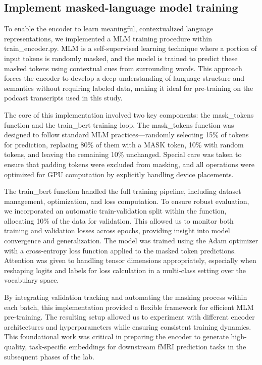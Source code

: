 \documentclass[11pt,letterpaper]{article}
\begin{document}
\vspace{1em} %
\subsection{Implement masked-language model training}
\vspace{0.5em} %

To enable the encoder to learn meaningful, contextualized language representations, we implemented a MLM training procedure within train\_encoder.py. MLM is a self-supervised learning technique where a portion of input tokens is randomly masked, and the model is trained to predict these masked tokens using contextual cues from surrounding words. This approach forces the encoder to develop a deep understanding of language structure and semantics without requiring labeled data, making it ideal for pre-training on the podcast transcripts used in this study.

The core of this implementation involved two key components: the mask\_tokens function and the train\_bert training loop. The mask\_tokens function was designed to follow standard MLM practices—randomly selecting 15\% of tokens for prediction, replacing 80\% of them with a MASK token, 10\% with random tokens, and leaving the remaining 10\% unchanged. Special care was taken to ensure that padding tokens were excluded from masking, and all operations were optimized for GPU computation by explicitly handling device placements.

The train\_bert function handled the full training pipeline, including dataset management, optimization, and loss computation. To ensure robust evaluation, we incorporated an automatic train-validation split within the function, allocating 10\% of the data for validation. This allowed us to monitor both training and validation losses across epochs, providing insight into model convergence and generalization. The model was trained using the Adam optimizer with a cross-entropy loss function applied to the masked token predictions. Attention was given to handling tensor dimensions appropriately, especially when reshaping logits and labels for loss calculation in a multi-class setting over the vocabulary space.

By integrating validation tracking and automating the masking process within each batch, this implementation provided a flexible framework for efficient MLM pre-training. The resulting setup allowed us to experiment with different encoder architectures and hyperparameters while ensuring consistent training dynamics. This foundational work was critical in preparing the encoder to generate high-quality, task-specific embeddings for downstream fMRI prediction tasks in the subsequent phases of the lab.
\end{document}
